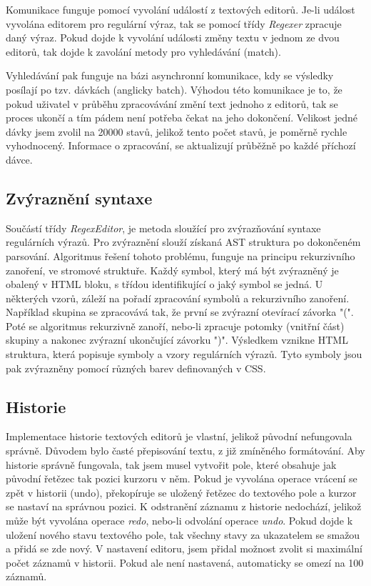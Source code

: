 Komunikace funguje pomocí vyvolání událostí z textových editorů.
Je-li událost vyvolána editorem pro regulární výraz, tak se pomocí třídy \textit{Regexer} zpracuje daný výraz.
Pokud dojde k vyvolání události změny textu v jednom ze dvou editorů, tak dojde k zavolání metody pro vyhledávání (match).

Vyhledávání pak funguje na bázi asynchronní komunikace, kdy se výsledky posílají po tzv. dávkách (anglicky batch).
Výhodou této komunikace je to, že pokud uživatel v průběhu zpracovávání změní text jednoho z editorů, tak se proces ukončí a tím pádem není potřeba čekat na jeho dokončení.
Velikost jedné dávky jsem zvolil na 20000 stavů, jelikož tento počet stavů, je poměrně rychle vyhodnocený.
Informace o zpracování, se aktualizují průběžně po každé příchozí dávce.

\subsection*{Zvýraznění syntaxe}

Součástí třídy \textit{RegexEditor}, je metoda sloužící pro zvýrazňování syntaxe regulárních výrazů. 
Pro zvýraznění slouží získaná AST struktura po dokončeném parsování.
Algoritmus řešení tohoto problému, funguje na principu rekurzivního zanoření, ve stromové struktuře.
Každý symbol, který má být zvýrazněný je obalený v HTML bloku, s třídou identifikující o jaký symbol se jedná.
U některých vzorů, záleží na pořadí zpracování symbolů a rekurzivního zanoření.
Například skupina se zpracovává tak, že první se zvýrazní otevírací závorka "(".
Poté se algoritmus rekurzivně zanoří, nebo-li zpracuje potomky (vnitřní část) skupiny a nakonec zvýrazní ukončující závorku ")".
Výsledkem vznikne HTML struktura, která popisuje symboly a vzory regulárních výrazů.
Tyto symboly jsou pak zvýrazněny pomocí různých barev definovaných v CSS.

\subsection*{Historie}
Implementace historie textových editorů je vlastní, jelikož původní nefungovala správně.
Důvodem bylo časté přepisování textu, z již zmíněného formátování.
Aby historie správně fungovala, tak jsem musel vytvořit pole, které obsahuje jak původní řetězec tak pozici kurzoru v něm.
Pokud je vyvolána operace vrácení se zpět v historii (undo), překopíruje se uložený řetězec do textového pole a kurzor se nastaví na správnou pozici.
K odstranění záznamu z historie nedochází, jelikož může být vyvolána operace \textit{redo}, nebo-li odvolání operace \textit{undo}.
Pokud dojde k uložení nového stavu textového pole, tak všechny stavy za ukazatelem se smažou a přidá se zde nový.
V nastavení editoru, jsem přidal možnost zvolit si maximální počet záznamů v historii.
Pokud ale není nastavená, automaticky se omezí na 100 záznamů.

